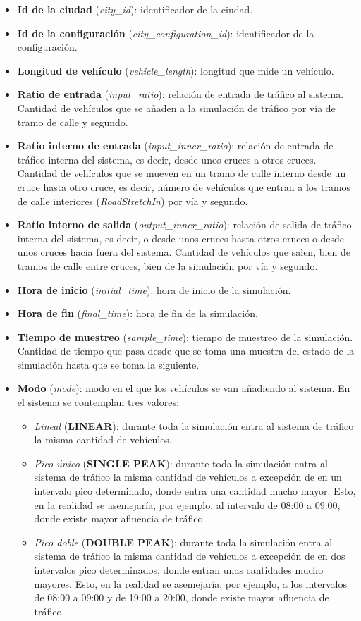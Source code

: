 \begin{itemize}
    \item \textbf{Id de la ciudad} (\textit{city\_id}): identificador de la ciudad.
    \item \textbf{Id de la configuración} (\textit{city\_configuration\_id}): identificador de la configuración.
    \item \textbf{Longitud de vehículo} (\textit{vehicle\_length}): longitud que mide un vehículo.
    \item \textbf{Ratio de entrada} (\textit{input\_ratio}): relación de entrada de tráfico al sistema. Cantidad de vehículos que se añaden a la simulación de tráfico por vía de tramo de calle y segundo.
    \item \textbf{Ratio interno de entrada} (\textit{input\_inner\_ratio}): relación de entrada de tráfico interna del sistema, es decir, desde unos cruces a otros cruces. Cantidad de vehículos que se mueven en un tramo de calle interno desde un cruce hasta otro cruce, es decir, número de vehículos que entran a los tramos de calle interiores (\textit{RoadStretchIn}) por vía y segundo.
    \item \textbf{Ratio interno de salida} (\textit{output\_inner\_ratio}): relación de salida de tráfico interna del sistema, es decir, o desde unos cruces hasta otros cruces o desde unos cruces hacia fuera del sistema. Cantidad de vehículos que salen, bien de tramos de calle entre cruces, bien de la simulación por vía y segundo.
    \item \textbf{Hora de inicio} (\textit{initial\_time}): hora de inicio de la simulación.
    \item \textbf{Hora de fin} (\textit{final\_time}): hora de fin de la simulación.
    \item \textbf{Tiempo de muestreo} (\textit{sample\_time}): tiempo de muestreo de la simulación. Cantidad de tiempo que pasa desde que se toma una muestra del estado de la simulación hasta que se toma la siguiente.
    \item \textbf{Modo} (\textit{mode}): modo en el que los vehículos se van añadiendo al sistema. En el sistema se contemplan tres valores:
    \begin{itemize}
        \item \textit{Lineal} (\textbf{LINEAR}): durante toda la simulación entra al sistema de tráfico la misma cantidad de vehículos.
        \item \textit{Pico único} (\textbf{SINGLE PEAK}): durante toda la simulación entra al sistema de tráfico la misma cantidad de vehículos a excepción de en un intervalo pico determinado, donde entra una cantidad mucho mayor. Esto, en la realidad se asemejaría, por ejemplo, al intervalo de 08:00 a 09:00, donde existe mayor afluencia de tráfico.
        \item \textit{Pico doble} (\textbf{DOUBLE PEAK}): durante toda la simulación entra al sistema de tráfico la misma cantidad de vehículos a excepción de en dos intervalos pico determinados, donde entran unas cantidades mucho mayores. Esto, en la realidad se asemejaría, por ejemplo, a los intervalos de 08:00 a 09:00 y de 19:00 a 20:00, donde existe mayor afluencia de tráfico.
    \end{itemize}
\end{itemize}
